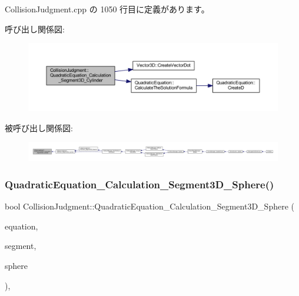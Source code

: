  Collision\+Judgment.\+cpp の 1050 行目に定義があります。

呼び出し関係図\+:\nopagebreak
\begin{figure}[H]
\begin{center}
\leavevmode
\includegraphics[width=350pt]{class_collision_judgment_aa7d814d54f323c366de1d068440ded2b_cgraph}
\end{center}
\end{figure}
被呼び出し関係図\+:
\nopagebreak
\begin{figure}[H]
\begin{center}
\leavevmode
\includegraphics[width=350pt]{class_collision_judgment_aa7d814d54f323c366de1d068440ded2b_icgraph}
\end{center}
\end{figure}
\mbox{\label{class_collision_judgment_adf8acb73719d92f6b5dbd9a6989571ad}} 
\subsubsection{\texorpdfstring{Quadratic\+Equation\+\_\+\+Calculation\+\_\+\+Segment3\+D\+\_\+\+Sphere()}{QuadraticEquation\_Calculation\_Segment3D\_Sphere()}}
{\footnotesize\ttfamily bool Collision\+Judgment\+::\+Quadratic\+Equation\+\_\+\+Calculation\+\_\+\+Segment3\+D\+\_\+\+Sphere (\begin{DoxyParamCaption}\item[{\mbox{\hyperlink{class_quadratic_equation}{Quadratic\+Equation}} $\ast$}]{equation,  }\item[{const \mbox{\hyperlink{class_segment}{Segment}} $\ast$}]{segment,  }\item[{const \mbox{\hyperlink{class_sphere}{Sphere}} $\ast$}]{sphere }\end{DoxyParamCaption})\hspace{0.3cm}{\ttfamily [static]}, {\ttfamily [private]}}



